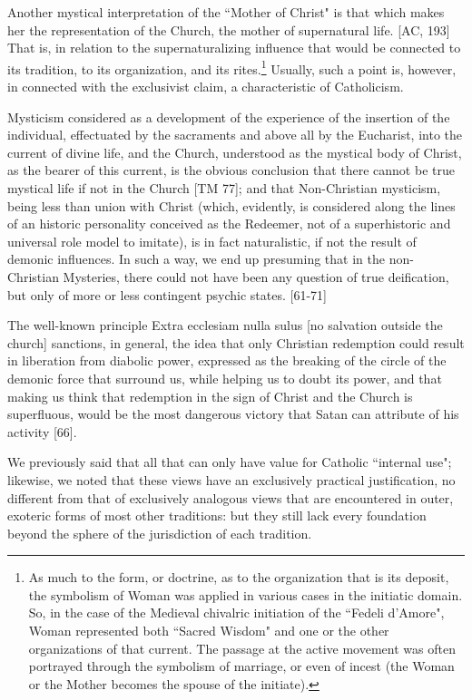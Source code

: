 Another mystical interpretation of the ``Mother of Christ" is that which makes her the representation of the Church, the mother of supernatural life. [AC, 193] That is, in relation to the supernaturalizing influence that would be connected to its tradition, to its organization, and its rites.\footnote{As much to the form, or doctrine, as to the organization that is its deposit, the symbolism of Woman was applied in various cases in the initiatic domain. So, in the case of the Medieval chivalric initiation of the ``Fedeli d'Amore", Woman represented both ``Sacred Wisdom" and one or the other organizations of that current. The passage at the active movement was often portrayed through the symbolism of marriage, or even of incest (the Woman or the Mother becomes the spouse of the initiate).} Usually, such a point is, however, in connected with the exclusivist claim, a characteristic of Catholicism.

Mysticism considered as a development of the experience of the insertion of the individual, effectuated by the sacraments and above all by the Eucharist, into the current of divine life, and the Church, understood as the mystical body of Christ, as the bearer of this current, is the obvious conclusion that there cannot be true mystical life if not in the Church [TM 77]; and that Non-Christian mysticism, being less than union with Christ (which, evidently, is considered along the lines of an historic personality conceived as the Redeemer, not of a superhistoric and universal role model to imitate), is in fact naturalistic, if not the result of demonic influences. In such a way, we end up presuming that in the non-Christian Mysteries, there could not have been any question of true deification, but only of more or less contingent psychic states. [61-71]

The well-known principle Extra ecclesiam nulla sulus [no salvation outside the church] sanctions, in general, the idea that only Christian redemption could result in liberation from diabolic power, expressed as the breaking of the circle of the demonic force that surround us, while helping us to doubt its power, and that making us think that redemption in the sign of Christ and the Church is superfluous, would be the most dangerous victory that Satan can attribute of his activity [66].

We previously said that all that can only have value for Catholic ``internal use"; likewise, we noted that these views have an exclusively practical justification, no different from that of exclusively analogous views that are encountered in outer, exoteric forms of most other traditions: but they still lack every foundation beyond the sphere of the jurisdiction of each tradition.

